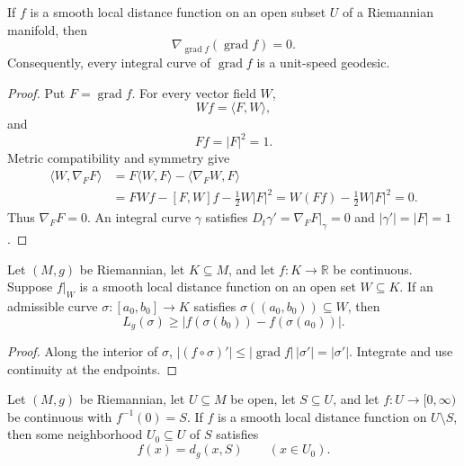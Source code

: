 \begin{theorem}
\label{thm:local-distance-geodesic-integral-curve}

If $f$ is a smooth local distance function on an open subset $U$ of a
Riemannian manifold, then
\[
\nabla_{\operatorname{grad}f}(\operatorname{grad}f)=0.
\]
Consequently, every integral curve of $\operatorname{grad}f$ is a unit-speed
geodesic.
\end{theorem}

\begin{proof}
\sketch Put $F=\operatorname{grad}f$. For every vector field $W$,
\begin{equation}
Wf=\langle F,W\rangle,
\tag{6.15}
\end{equation}
and
\begin{equation}
Ff=|F|^2=1.
\tag{6.16}
\end{equation}
Metric compatibility and symmetry give
\begin{align*}
\langle W,\nabla_FF\rangle
&=F\langle W,F\rangle-\langle\nabla_FW,F\rangle\\
&=FWf-[F,W]f-\tfrac12W|F|^2
=W(Ff)-\tfrac12W|F|^2=0.
\end{align*}
Thus $\nabla_FF=0$. An integral curve $\gamma$ satisfies
$D_t\gamma'=\nabla_FF|_\gamma=0$ and $|\gamma'|=|F|=1$.
\end{proof}

\begin{lemma}
\label{lem:local-distance-curve-arc-length}

Let $(M,g)$ be Riemannian, let $K\subseteq M$, and let $f:K\to\mathbb R$ be
continuous. Suppose $f|_W$ is a smooth local distance function on an open set
$W\subseteq K$. If an admissible curve
$\sigma:[a_0,b_0]\to K$ satisfies
$\sigma((a_0,b_0))\subseteq W$, then
\[
L_g(\sigma)\geq|f(\sigma(b_0))-f(\sigma(a_0))|.
\]
\end{lemma}

\begin{proof}
\sketch Along the interior of $\sigma$,
$|(f\circ\sigma)'|\leq|\operatorname{grad}f|\,|\sigma'|=|\sigma'|$.
Integrate and use continuity at the endpoints.
\end{proof}

\begin{theorem}
\label{thm:smooth-local-distance-function}

Let $(M,g)$ be Riemannian, let $U\subseteq M$ be open, let $S\subseteq U$,
and let $f:U\to[0,\infty)$ be continuous with $f^{-1}(0)=S$. If $f$ is a
smooth local distance function on $U\setminus S$, then some neighborhood
$U_0\subseteq U$ of $S$ satisfies
\[
f(x)=d_g(x,S)
\qquad(x\in U_0).
\]
\end{theorem}

